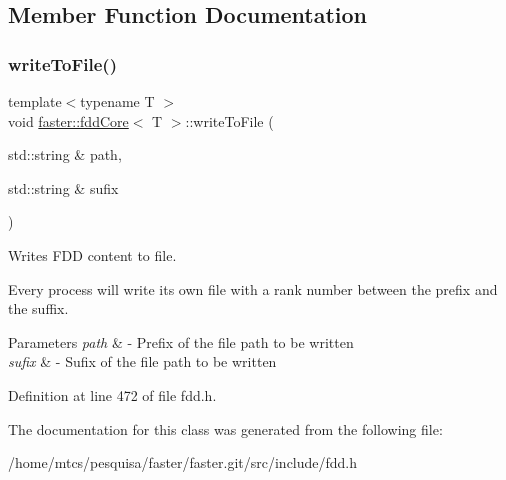 \subsection{Member Function Documentation}
\hypertarget{classfaster_1_1fddCore_a9504c32481c67c2ceaf98d132ef37ee6}{}\label{classfaster_1_1fddCore_a9504c32481c67c2ceaf98d132ef37ee6} 
\subsubsection{\texorpdfstring{write\+To\+File()}{writeToFile()}}
{\footnotesize\ttfamily template$<$typename T $>$ \\
void \hyperlink{classfaster_1_1fddCore}{faster\+::fdd\+Core}$<$ T $>$\+::write\+To\+File (\begin{DoxyParamCaption}\item[{std\+::string \&}]{path,  }\item[{std\+::string \&}]{sufix }\end{DoxyParamCaption})}



Writes F\+DD content to file. 

Every process will write its own file with a rank number between the prefix and the suffix.


\begin{DoxyParams}{Parameters}
{\em path} & -\/ Prefix of the file path to be written \\
\hline
{\em sufix} & -\/ Sufix of the file path to be written \\
\hline
\end{DoxyParams}


Definition at line 472 of file fdd.\+h.



The documentation for this class was generated from the following file\+:\begin{DoxyCompactItemize}
\item 
/home/mtcs/pesquisa/faster/faster.\+git/src/include/fdd.\+h\end{DoxyCompactItemize}
